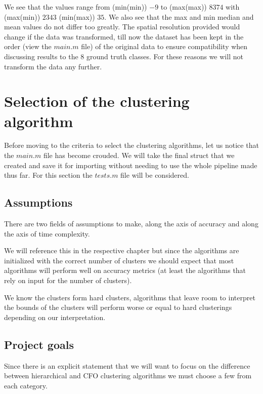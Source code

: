 \documentclass[12pt, a4paper]{article}
\begin{document}
We see that the values range from (min(min)) $-9$ to (max(max)) $8374$ with (max(min)) $2343$ (min(max)) $35$. We also see that the max and min median and mean values do not differ too greatly. The spatial resolution provided would change if the data was transformed, till now the dataset has been kept in the order (view the $main.m$ file) of the original data to ensure compatibility when discussing results to the 8 ground truth classes. For these reasons we will not transform the data any further.

\section{Selection of the clustering algorithm}

Before moving to the criteria to select the clustering algorithms, let us notice that the $main.m$ file has become crouded. We will take the final struct that we created and save it for importing without needing to use the whole pipeline made thus far. For this section the $tests.m$ file will be considered.

\subsection{Assumptions}

There are two fields of assumptions to make, along the axis of accuracy and along the axis of time complexity.
\newline

We will reference this in the respective chapter but since the algorithms are initialized with the correct number of clusters we should expect that most algorithms will perform well on accuracy metrics (at least the algorithms that rely on input for the number of clusters).
\newline

We know the clusters form hard clusters, algorithms that leave room to interpret the bounds of the clusters will perform worse or equal to hard clusterings depending on our interpretation.

\subsection{Project goals}

Since there is an explicit statement that we will want to focus on the difference between hierarchical and CFO clustering algorithms we must choose a few from each category.
\newline
\end{document}

